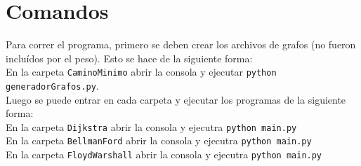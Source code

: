 \documentclass{article}
\def\code#1{\texttt{#1}}
\newcommand\tab[1][0.5cm]{\hspace*{#1}}
\begin{document}
    \section{Comandos}
        \tab Para correr el programa, primero se deben crear los archivos de grafos (no fueron incluídos por el peso).
        Esto se hace de la siguiente forma: \\
        \tab\tab En la carpeta \code{CaminoMinimo} abrir la consola y ejecutar \code{python generadorGrafos.py}. \\
        \tab Luego se puede entrar en cada carpeta y ejecutar los programas de la siguiente forma: \\
        \tab\tab En la carpeta \code{Dijkstra} abrir la consola y ejecutra \code{python main.py} \\
        \tab\tab En la carpeta \code{BellmanFord} abrir la consola y ejecutra \code{python main.py} \\
        \tab\tab En la carpeta \code{FloydWarshall} abrir la consola y ejecutra \code{python main.py} \\
\end{document}
